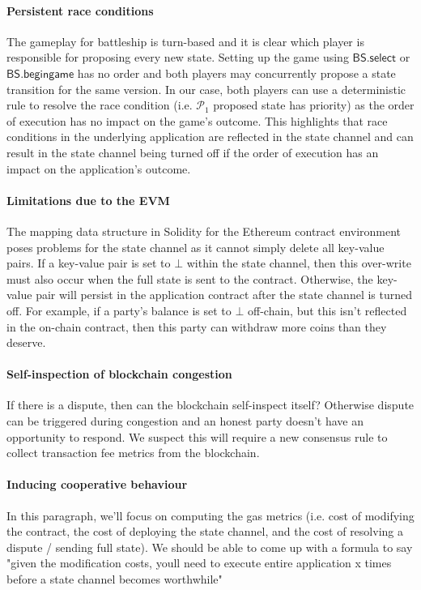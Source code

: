 \documentclass{llncs}
\newcommand{\participant}{\mathcal{P}}
\newcommand{\battleshipbegin}{\mathsf{BS.begingame}}
\newcommand{\battleshipselectboard}{\mathsf{BS.select}}
\begin{document}
	\paragraph{Persistent race conditions} 
	The gameplay for battleship is turn-based and it is clear which player is responsible for proposing every new state. 
	Setting up the game using $\battleshipselectboard$ or $\battleshipbegin$ has no order and both players may concurrently propose a state transition for the same version. 
	In our case, both players can use a deterministic rule to resolve the race condition (i.e. $\participant_{1}$ proposed state has priority) as the order of execution has no impact on the game's outcome. 
	This highlights that race conditions in the underlying application are reflected in the state channel and can result in the state channel being turned off if the order of execution has an impact on the application's outcome. 
	\paragraph{Limitations due to the EVM} 
	The mapping data structure in Solidity for the Ethereum contract environment poses problems for the state channel as it cannot simply delete all key-value pairs.
	If a key-value pair is set to $\bot$ within the state channel, then this over-write must also occur when the full state is sent to the contract. 
	Otherwise, the key-value pair will persist in the application contract after the state channel is turned off.
	For example, if a party's balance is set to $\bot$ off-chain, but this isn't reflected in the on-chain contract, then this party can withdraw more coins than they deserve. 
	
	\paragraph{Self-inspection of blockchain congestion} 
	If there is a dispute, then can the blockchain self-inspect itself? Otherwise dispute can be triggered during congestion and an honest party doesn't have an opportunity to respond.
	We suspect this will require a new consensus rule to collect transaction fee metrics from the blockchain. 
	
	\paragraph{Inducing cooperative behaviour} 
	In this paragraph, we'll focus on computing the gas metrics (i.e. cost of modifying the contract, the cost of deploying the state channel, and the cost of resolving a dispute / sending full state). We should be able to come up with a formula to say "given the modification costs, youll need to execute entire application x times before a state channel becomes worthwhile" 
	
\end{document}
